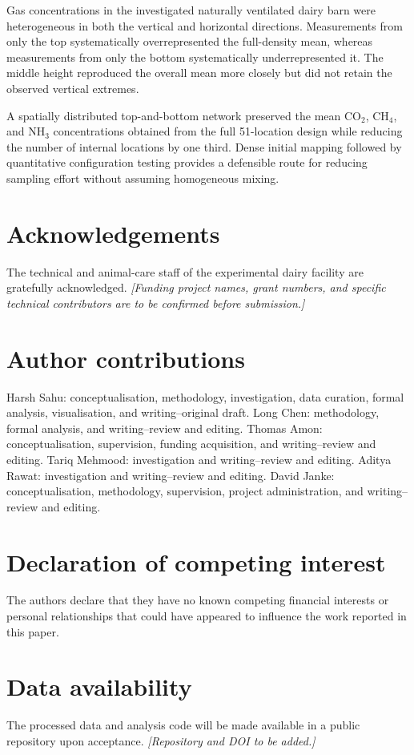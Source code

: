 \documentclass[12pt,a4paper]{article}
\begin{document}
Gas concentrations in the investigated naturally ventilated dairy barn were
heterogeneous in both the vertical and horizontal directions. Measurements
from only the top systematically overrepresented the full-density mean,
whereas measurements from only the bottom systematically underrepresented it.
The middle height reproduced the overall mean more closely but did not retain
the observed vertical extremes.

A spatially distributed top-and-bottom network preserved the mean
\(\mathrm{CO_2}\), \(\mathrm{CH_4}\), and \(\mathrm{NH_3}\)
concentrations obtained from the full 51-location design while reducing the
number of internal locations by one third. Dense initial mapping followed by
quantitative configuration testing provides a defensible route for reducing
sampling effort without assuming homogeneous mixing.

\section*{Acknowledgements}

The technical and animal-care staff of the experimental dairy facility are
gratefully acknowledged. \textit{[Funding project names, grant numbers, and
specific technical contributors are to be confirmed before submission.]}

\section*{Author contributions}

Harsh Sahu: conceptualisation, methodology, investigation, data curation,
formal analysis, visualisation, and writing--original draft. Long Chen:
methodology, formal analysis, and writing--review and editing. Thomas Amon:
conceptualisation, supervision, funding acquisition, and writing--review and
editing. Tariq Mehmood: investigation and writing--review and editing. Aditya
Rawat: investigation and writing--review and editing. David Janke:
conceptualisation, methodology, supervision, project administration, and
writing--review and editing.

\section*{Declaration of competing interest}

The authors declare that they have no known competing financial interests or
personal relationships that could have appeared to influence the work
reported in this paper.

\section*{Data availability}

The processed data and analysis code will be made available in a public
repository upon acceptance. \textit{[Repository and DOI to be added.]}



\end{document}
